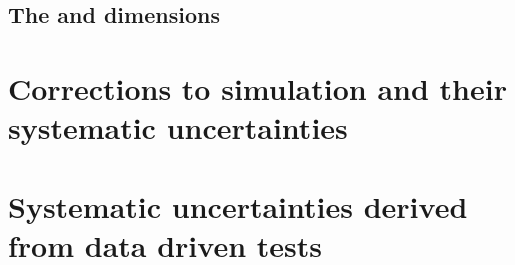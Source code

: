 \subsection{The \MHT and \nb dimensions}


\section{Corrections to simulation and their systematic uncertainties}








\section{Systematic uncertainties derived from data driven tests}


